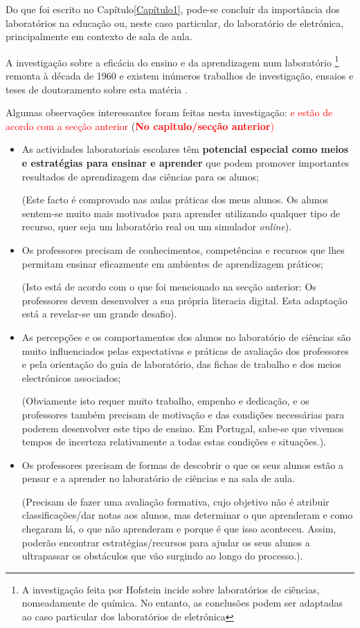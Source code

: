 Do que foi escrito no Capítulo\ref{Capítulo1}, pode-se concluir da importância dos laboratórios na educação ou, neste caso particular, do laboratório de eletrónica, principalmente em contexto de sala de aula.

A investigação sobre a eficácia do ensino e da aprendizagem num laboratório \footnote{A investigação feita por Hofstein \cite{Hofstein} incide sobre laboratórios de ciências, nomeadamente de química. No entanto, as conclusões podem ser adaptadas ao caso particular dos laboratórios de eletrónica} remonta à década de 1960 e existem inúmeros trabalhos de investigação, ensaios e teses de doutoramento sobre esta matéria \cite{Hofstein}.

Algumas observações interessantes foram feitas nesta investigação\cite{Hofstein}: \textcolor{red}{e estão de acordo com a secção anterior} (\textcolor{red}{\textbf{No capitulo/secção anterior})}
\begin{itemize}
    \item As actividades laboratoriais escolares têm \textbf{potencial especial como meios e estratégias para ensinar e aprender} que podem promover importantes resultados de aprendizagem das ciências para os alunos;

          (Este facto é comprovado nas aulas práticas dos meus alunos. Os alunos sentem-se muito mais motivados para aprender utilizando qualquer tipo de recurso, quer seja um laboratório real ou um simulador \textit{online}).
    \item Os professores precisam de conhecimentos, competências e recursos que lhes permitam ensinar eficazmente em ambientes de aprendizagem práticos;

          (Isto está de acordo com o que foi mencionado na secção anterior: Os professores devem desenvolver a sua própria literacia digital. Esta adaptação está a revelar-se um grande desafio).
    \item As percepções e os comportamentos dos alunos no laboratório de ciências são muito influenciados pelas expectativas e práticas de avaliação dos professores e pela orientação do guia de laboratório, das fichas de trabalho e dos meios electrónicos associados;

          (Obviamente isto requer muito trabalho, empenho e dedicação, e os professores também precisam de motivação e das condições necessárias para poderem desenvolver este tipo de ensino. Em Portugal, sabe-se que vivemos tempos de incerteza relativamente a todas estas condições e situações.).

    \item Os professores precisam de formas de descobrir o que os seus alunos estão a pensar e a aprender no laboratório de ciências e na sala de aula.

          (Precisam de fazer uma avaliação formativa, cujo objetivo não é atribuir classificações/dar notas aos alunos, mas determinar o que aprenderam e como chegaram lá, o que não aprenderam e porque é que isso aconteceu. Assim, poderão encontrar estratégias/recursos para ajudar os seus alunos a ultrapassar os obstáculos que vão surgindo ao longo do processo.).
\end{itemize}

